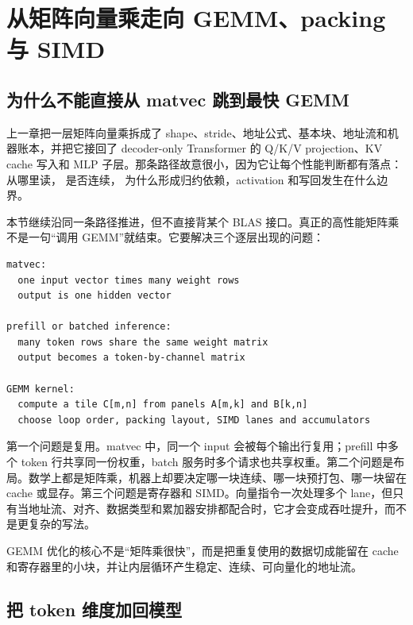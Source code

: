 \section{从矩阵向量乘走向 GEMM、packing 与 SIMD}

\subsection{为什么不能直接从 matvec 跳到最快 GEMM}

上一章把一层矩阵向量乘拆成了 shape、stride、地址公式、基本块、地址流和机器账本，并把它接回了 decoder-only Transformer 的 Q/K/V projection、KV cache 写入和 MLP 子层。那条路径故意很小，因为它让每个性能判断都有落点： 从哪里读， 是否连续， 为什么形成归约依赖，activation 和写回发生在什么边界。

本节继续沿同一条路径推进，但不直接背某个 BLAS 接口。真正的高性能矩阵乘不是一句“调用 GEMM”就结束。它要解决三个逐层出现的问题：

\begin{lstlisting}[numbers=none,caption={从 matvec 到 GEMM 的三个新问题}]
matvec:
  one input vector times many weight rows
  output is one hidden vector

prefill or batched inference:
  many token rows share the same weight matrix
  output becomes a token-by-channel matrix

GEMM kernel:
  compute a tile C[m,n] from panels A[m,k] and B[k,n]
  choose loop order, packing layout, SIMD lanes and accumulators
\end{lstlisting}

第一个问题是复用。matvec 中，同一个 input 会被每个输出行复用；prefill 中多个 token 行共享同一份权重，batch 服务时多个请求也共享权重。第二个问题是布局。数学上都是矩阵乘，机器上却要决定哪一块连续、哪一块预打包、哪一块留在 cache 或显存。第三个问题是寄存器和 SIMD。向量指令一次处理多个 lane，但只有当地址流、对齐、数据类型和累加器安排都配合时，它才会变成吞吐提升，而不是更复杂的写法。

\begin{keyidea}
GEMM 优化的核心不是“矩阵乘很快”，而是把重复使用的数据切成能留在 cache 和寄存器里的小块，并让内层循环产生稳定、连续、可向量化的地址流。
\end{keyidea}

\subsection{把 token 维度加回模型}

